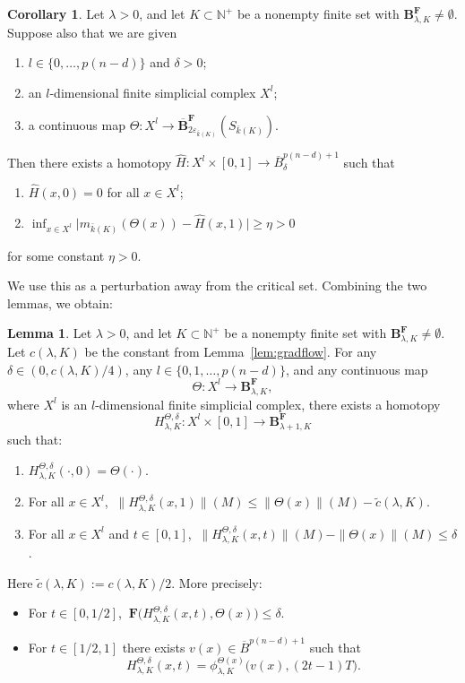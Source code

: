 \documentclass[12pt,english]{article}
\theoremstyle{definition}
\newtheorem{lemma}[theorem]{Lemma}
\newtheorem{corollary}[theorem]{Corollary}
\begin{document}
\begin{corollary}\label{unsthomotopycrit}
Let \(\lambda>0\), and let \(K\subset \mathbb{N}^+\) be a nonempty finite set with \(\mathbf{B}^\mathbf{F}_{\lambda,K}\neq\emptyset\). Suppose also that we are given
\begin{enumerate}
    \item $l\in\{0,\dots,p(n-d)\}$ and $\delta>0$;
    \item an $l$-dimensional finite simplicial complex $X^l$;
    \item a continuous map $\Theta:X^l\rightarrow \overline{\mathbf{B}}^\mathbf{F}_{2\varepsilon_{\bar k(K)}}(S_{\bar k(K)})$.
\end{enumerate}
Then there exists a homotopy $\hat H:X^l\times[0,1]\rightarrow \overline B^{p(n-d)+1}_\delta$ such that
\begin{enumerate}
    \item $\hat H(x,0)=0$ for all $x\in X^l$;
    \item $\inf_{x\in X^l}\bigl|m_{\bar k(K)}(\Theta(x))-\hat H(x,1)\bigr|\geq \eta>0$
\end{enumerate}
for some constant $\eta>0$.
\end{corollary}

We use this as a perturbation away from the critical set. Combining the two lemmas, we obtain:

\begin{lemma}\label{lem:homotopy}
Let \(\lambda>0\), and let \(K\subset \mathbb{N}^+\) be a nonempty finite set with \(\mathbf{B}^\mathbf{F}_{\lambda,K}\neq\emptyset\). Let \(c(\lambda,K)\) be the constant from Lemma~\ref{lem:gradflow}. For any \(\delta\in(0,c(\lambda,K)/4)\), any \(l\in\{0,1,\dots,p(n-d)\}\), and any continuous map
\[
\Theta:X^{l}\to \mathbf{B}^\mathbf{F}_{\lambda,K},
\]
where \(X^l\) is an \(l\)-dimensional finite simplicial complex, there exists a homotopy
\[
H^{\Theta,\delta}_{\lambda,K}:X^l\times[0,1]\to \mathbf{B}^\mathbf{F}_{\lambda+1,K}
\]
such that:
\begin{enumerate}
    \item \(H^{\Theta,\delta}_{\lambda,K}(\cdot,0)=\Theta(\cdot)\).
    \item For all \(x\in X^l\), \(\ \|H^{\Theta,\delta}_{\lambda,K}(x,1)\|(M)\le \|\Theta(x)\|(M)-\tilde c(\lambda,K)\).
    \item For all \(x\in X^l\) and \(t\in[0,1]\), \(\ \|H^{\Theta,\delta}_{\lambda,K}(x,t)\|(M)-\|\Theta(x)\|(M)\le \delta\).
\end{enumerate}
Here \(\tilde c(\lambda,K):=c(\lambda,K)/2\). More precisely:
\begin{itemize}
    \item For \(t\in[0,1/2]\), \(\ \mathbf{F}\bigl(H^{\Theta,\delta}_{\lambda,K}(x,t),\Theta(x)\bigr)\le \delta\).
    \item For \(t\in[1/2,1]\) there exists \(v(x)\in \overline{B}^{p(n-d)+1}\) such that
    \[
        H^{\Theta,\delta}_{\lambda,K}(x,t)=\phi^{\Theta(x)}_{\lambda,K}\bigl(v(x),(2t-1)T\bigr).
    \]
\end{itemize}
\end{lemma}
\end{document}
